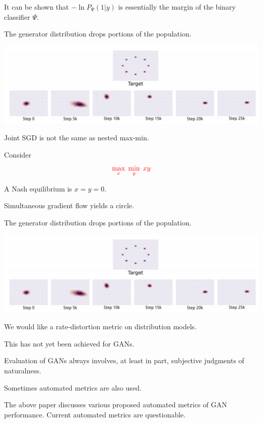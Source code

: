 {\vfill
It can be shown that $- \ln P_\Psi(1|y)$ is essentially the margin of the binary classifier $\Psi$.



The generator distribution drops portions of the population.

\centerline{\includegraphics[width=9in]{../images/Unstable1}}


Joint SGD is not the same as nested max-min.

\vfill
Consider
$${\color{red} \max_x \; \min_y\; xy}$$

\vfill
A Nash equilibrium is $x= y = 0$.

\vfill
Simultaneous gradient flow yields a circle.


The generator distribution drops portions of the population.

\centerline{\includegraphics[width=9in]{../images/Unstable1}}


We would like a rate-distortion metric on distribution models.

\vfill
This has not yet been achieved for GANs.

\vfill
Evaluation of GANs always involves, at least in part, subjective judgments of naturalness.

\vfill
Sometimes automated metrics are also used.

\vfill
The above paper discusses various proposed automated metrics of GAN performance.  Current automated metrics are questionable.

}

